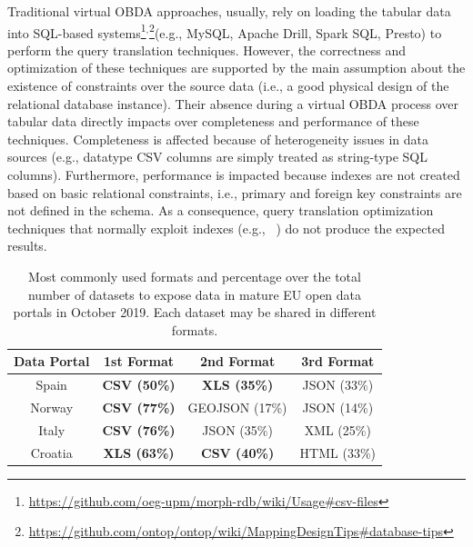 Traditional virtual OBDA approaches, usually, rely on loading the tabular data into SQL-based systems\footnote{\url{https://github.com/oeg-upm/morph-rdb/wiki/Usage\#csv-files}}$^,$\footnote{\url{https://github.com/ontop/ontop/wiki/MappingDesignTips\#database-tips}}(e.g., MySQL, Apache Drill, Spark SQL, Presto) to perform the query translation techniques. However, the correctness and optimization of these techniques are supported by the main assumption about the existence of constraints over the source data (i.e., a good physical design of the relational database instance). Their absence during a virtual OBDA process over tabular data directly impacts over completeness and performance of these techniques. Completeness is affected because of heterogeneity issues in data sources (e.g., datatype CSV columns are simply treated as string-type SQL columns). Furthermore, performance is impacted because indexes are not created based on basic relational constraints, i.e., primary and foreign key constraints are not defined in the schema. As a consequence, query translation optimization techniques that normally exploit indexes (e.g., ~\citep{rodriguez2015efficient,priyatna2014formalisation}) do not produce the expected results.
\begin{table}[t]
\centering
\caption[Formast and percentage of data portal in EU]{Most commonly used formats and percentage over the total number of datasets to expose data in mature EU open data portals in October 2019. Each dataset may be shared in different formats.}
\label{tab:odp}
\begin{tabular}{c|c|c|c}
\hline
\textbf{Data Portal} & \textbf{1st Format}  & \textbf{2nd Format} & \textbf{3rd Format} \\ \hline
Spain                & \textbf{CSV (50\%)}  & \textbf{XLS (35\%)}  & JSON (33\%)          \\ 
Norway               & \textbf{CSV (77\%)}    & GEOJSON (17\%)         & JSON (14\%)            \\ 
Italy               & \textbf{CSV (76\%)}  & JSON (35\%)          & XML (25\%)           \\ 
Croatia              & \textbf{XLS (63\%)}    & \textbf{CSV (40\%)}   & HTML (33\%)           \\ \hline
\end{tabular}
\end{table}

